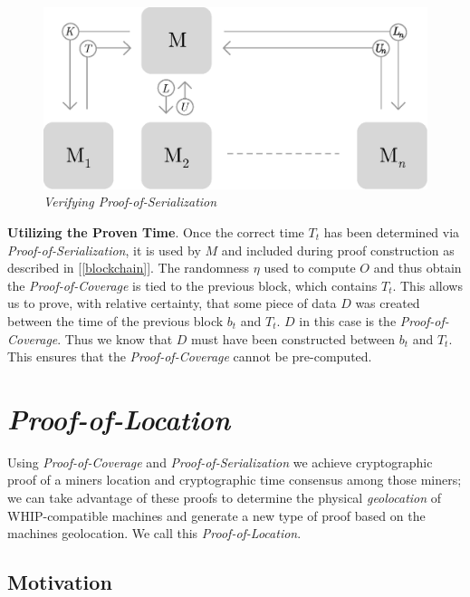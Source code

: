 \documentclass[10pt, nonatbib, nocopyrightspace, reprint]{sigplanconf}
\newcommand{\secref}[1]{[\autoref{#1}]}
\begin{document}
\begin{figure}[ht]
    \begin{center}
          \includegraphics[width=\columnwidth]{verify_serialization.eps}
          \caption{\emph{Verifying Proof-of-Serialization}}
          \label{fig:verify-serialization}
     \end{center}
\end{figure}

\textbf{Utilizing the Proven Time}. Once the correct time $T_t$ has been determined via \emph{Proof-of-Serialization}, it is used by $M$ and included during proof construction as described in \secref{blockchain}. The randomness $\eta$ used to compute $O$ and thus obtain the \emph{Proof-of-Coverage} is tied to the previous block, which contains $T_t$. This allows us to prove, with relative certainty, that some piece of data $D$ was created between the time of the previous block $b_t$ and $T_t$. $D$ in this case is the \emph{Proof-of-Coverage}. Thus we know that $D$ must have been constructed between $b_t$ and $T_t$. This ensures that the \emph{Proof-of-Coverage} cannot be pre-computed.

\section{\emph{Proof-of-Location}} \label{geolocation}

Using \emph{Proof-of-Coverage} and \emph{Proof-of-Serialization} we achieve cryptographic proof of a miners location and cryptographic time consensus among those miners; we can take advantage of these proofs to determine the physical \emph{geolocation} of WHIP-compatible machines and generate a new type of proof based on the machines geolocation. We call this \emph{Proof-of-Location}.

\subsection{Motivation}
\end{document}
